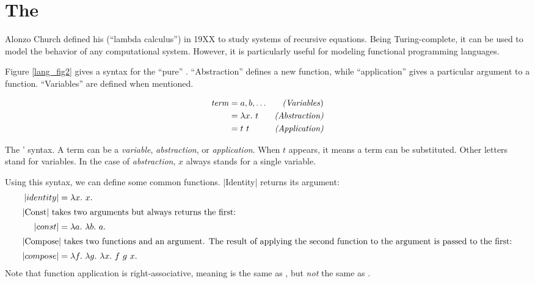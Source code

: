 \documentclass[12pt]{report}
\begin{document}

\section{The \LamA}


Alonzo Church defined his \lamA (``lambda calculus'') in 19XX
\citep{ChurchXX} to study systems of recursive equations. Being
Turing-complete, it can be used to model the behavior of any
computational system. However, it is particularly useful for modeling
functional programming languages. %

Figure \ref{lang_fig2} gives a syntax for the ``pure''
\lamA. ``Abstraction'' defines a new function, while ``application''
gives a particular argument to a function. ``Variables'' are defined
when mentioned. 

\begin{myfig}[ht]
  \begin{equation*}
    \begin{aligned}
      \mathit{term} &= a, b, \ldots & \text{\emph{(Variables})} \\
      &= \lambda x.\ t & \text{\emph{(Abstraction)}} \\
      &= t\ t & \text{\emph{(Application)}}
    \end{aligned}
  \end{equation*}
  \caption{The \lamA' syntax. A term can be a \emph{variable}, \emph{abstraction},
  or \emph{application}. When $t$ appears, it means a term can be substituted. Other
  letters stand for variables. In the case of \emph{abstraction}, $x$ always stands
  for a single variable.}
  \label{lang_fig2}
\end{myfig}


Using this syntax, we can define some common functions. |Identity|
returns its argument:
\begin{align}
  |identity| &= \lambda x.\ x. \label{eq_lang2} \\
  \intertext{|Const| takes two arguments but always returns the first:}
  |const| &= \lambda a.\ \lambda b.\ a. \label{eq_lang4} \\
  \intertext{|Compose| takes two functions and an argument. The result of
    applying the second function to the argument is passed to the first:}
  |compose| &= \lambda f.\ \lambda g.\ \lambda x.\ f\ g\ x. \label{eq_lang3} 
\end{align}
Note that function application is right-associative, meaning
 is the same as ,
but \emph{not} the same as .
\end{document}
